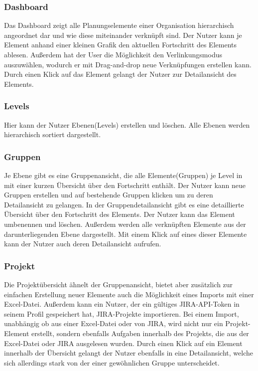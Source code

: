 \subsubsection{Dashboard}
Das Dashboard zeigt alle Planungselemente einer Organisation hierarchisch angeordnet dar und wie diese miteinander verknüpft sind. Der Nutzer kann je Element anhand einer kleinen Grafik den aktuellen Fortschritt des Elements ablesen. Außerdem hat der User die Möglichkeit den Verlinkungsmodus auszuwählen, wodurch er mit Drag-and-drop neue Verknüpfungen erstellen kann. Durch einen Klick auf das Element gelangt der Nutzer zur Detailansicht des Elements.

\subsubsection{Levels}
Hier kann der Nutzer Ebenen(Levels) erstellen und löschen. Alle Ebenen werden hierarchisch sortiert dargestellt.

\subsubsection{Gruppen}
Je Ebene gibt es eine Gruppenansicht, die alle Elemente(Gruppen) je Level in mit einer kurzen Übersicht über den Fortschritt enthält. Der Nutzer kann neue Gruppen erstellen und auf bestehende Gruppen klicken um zu deren Detailansicht zu gelangen.
In der Gruppendetailansicht gibt es eine detaillierte Übersicht über den Fortschritt des Elements. Der Nutzer kann das Element umbenennen und löschen. Außerdem werden alle verknüpften Elemente aus der darunterliegenden Ebene dargestellt. Mit einem Klick auf eines dieser Elemente kann der Nutzer auch deren Detailansicht aufrufen.

\subsubsection{Projekt}
Die Projektübersicht ähnelt der Gruppenansicht, bietet aber zusätzlich zur einfachen Erstellung neuer Elemente auch die Möglichkeit eines Imports mit einer Excel-Datei. Außerdem kann ein Nutzer, der ein gültiges JIRA-API-Token in seinem Profil gespeichert hat, JIRA-Projekte importieren. Bei einem Import, unabhängig ob aus einer Excel-Datei oder von JIRA, wird nicht nur ein Projekt-Element erstellt, sondern ebenfalls Aufgaben innerhalb des Projekts, die aus der Excel-Datei oder JIRA ausgelesen wurden.
Durch einen Klick auf ein Element innerhalb der Übersicht gelangt der Nutzer ebenfalls in eine Detailansicht, welche sich allerdings stark von der einer gewöhnlichen Gruppe unterscheidet.

